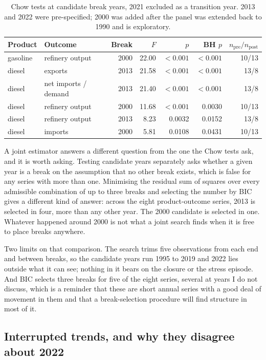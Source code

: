 \documentclass[11pt,a4paper]{article}
\begin{document}
\begin{table}[htbp]
\centering
\caption{Chow tests at candidate break years, 2021 excluded as a transition year. 2013 and 2022
were pre-specified; 2000 was added after the panel was extended back to 1990 and is exploratory.}
\label{tab:breaks}
\begin{tabular}{llrrrrr}
\toprule
Product & Outcome & Break & $F$ & $p$ & BH $p$ & $n_{\text{pre}}/n_{\text{post}}$ \\
\midrule
gasoline & refinery output & 2000 & 22.00 & $<0.001$ & $<0.001$ & 10/13 \\
diesel & exports & 2013 & 21.58 & $<0.001$ & $<0.001$ & 13/8 \\
diesel & net imports / demand & 2013 & 21.40 & $<0.001$ & $<0.001$ & 13/8 \\
diesel & refinery output & 2000 & 11.68 & $<0.001$ & 0.0030 & 10/13 \\
diesel & refinery output & 2013 & 8.23 & 0.0032 & 0.0152 & 13/8 \\
diesel & imports & 2000 & 5.81 & 0.0108 & 0.0431 & 10/13 \\
\bottomrule
\end{tabular}
\end{table}

A joint estimator answers a different question from the one the Chow tests ask, and it is worth
asking. Testing candidate years separately asks whether a given year is a break on the
assumption that no other break exists, which is false for any series with more than one.
Minimising the residual sum of squares over every admissible combination of up to three breaks
and selecting the number by BIC \citep{bai1998estimating, bai2003computation} gives a different
kind of answer: across the eight product-outcome series, 2013 is selected in four, more than any
other year. The 2000 candidate is selected in one. Whatever happened around 2000 is not what a
joint search finds when it is free to place breaks anywhere.

Two limits on that comparison. The search trims five observations from each end and between
breaks, so the candidate years run 1995 to 2019 and 2022 lies outside what it can see; nothing
in it bears on the closure or the stress episode. And BIC selects three breaks for five of the
eight series, several at years I do not discuss, which is a reminder that these are short annual
series with a good deal of movement in them and that a break-selection procedure will find
structure in most of it.

\subsection{Interrupted trends, and why they disagree about 2022}
\label{sec:its}
\end{document}
